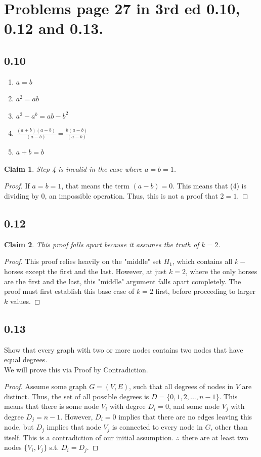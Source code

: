 \documentclass[11pt]{article}
\newtheorem*{claim*}{Claim}
\begin{document}
\section{Problems page 27 in 3rd ed 0.10, 0.12 and 0.13.}
\subsection*{0.10}
\begin{enumerate}
\item $a = b$
\item $a^2 = ab$
\item $a^2 - a^b = ab - b^2$
\item $\frac{(a + b)(a - b)}{(a - b)} = \frac{b(a - b)}{(a - b)}$
\item $a + b = b$
\end{enumerate}
\begin{claim*} Step 4 is invalid in the case where $a = b = 1$. \end{claim*}
\begin{proof} If $a = b = 1$, that means the term $(a - b) = 0$. This means that (4) is dividing by $0$, an impossible operation. Thus, this is not a proof that $2 = 1$. \end{proof}

\subsection*{0.12}
\begin{claim*} This proof falls apart because it assumes the truth of $k = 2$. \end{claim*}
\begin{proof}
This proof relies heavily on the "middle" set $H_1$, which contains all $k-$horses except the first and the last. However, at just $k = 2$, where the only horses are the first and the last, this "middle" argument falls apart completely. The proof must first establish this base case of $k = 2$ first, before proceeding to larger $k$ values.
\end{proof}

\subsection*{0.13}
Show that every graph with two or more nodes contains two nodes that have equal degrees.\\
We will prove this via Proof by Contradiction.
\begin{proof}
Assume some graph $G = (V, E)$, such that all degrees of nodes in $V$ are distinct. Thus, the set of all possible degrees is $D = \{0, 1, 2, ... , n -1\}$. This means that there is some node $V_i$ with degree $D_i = 0$, and some node $V_j$ with degree $D_j = n-1$. However, $D_i = 0$ implies that there are no edges leaving this node, but $D_j$ implies that node $V_j$ is connected to every node in $G$, other than itself. This is a contradiction of our initial assumption. $\therefore$ there are at least two nodes $\{V_i, V_j\}$ s.t. $D_i = D_j$.
\end{proof}
\end{document}

